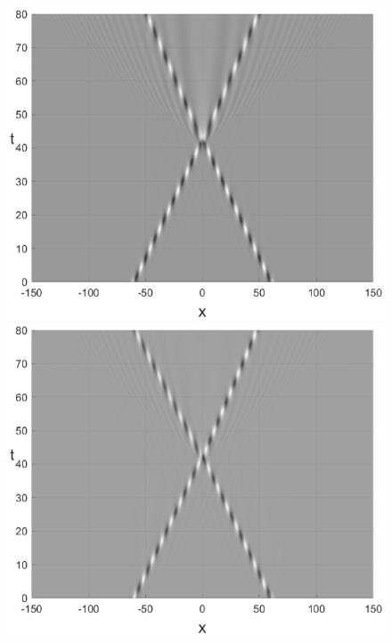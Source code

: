 \documentclass[preprint,12pt]{elsarticle}
\begin{document}
\begin{figure}[H]
\begin{minipage}[h]{0.32\linewidth}
\includegraphics[width=1\linewidth]{fig52g.eps}
\end{minipage}
\begin{minipage}[h]{0.32\linewidth}
\includegraphics[width=1\linewidth]{fig55g.eps}

\end{minipage}
\end{figure}
\end{document}

